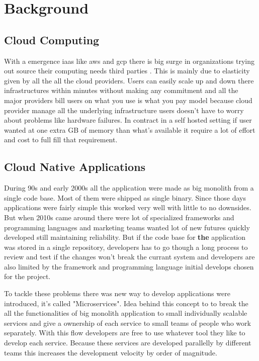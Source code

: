\section{Background}

\subsection{Cloud Computing}
With a emergence \ac{iaas} like \ac{aws} and \ac{gcp} there is big surge in organizations trying out source their computing needs third parties \citep{rimol_2021}. This is mainly due to elasticity given by all the all the cloud providers. Users can easily scale up and down there infrastructures within minutes without making any commitment and all the major providers bill users on what you use is what you pay model because cloud provider manage all the underlying infrastructure users doesn't have to worry about problems like hardware failures. In contract in a self hosted setting if user wanted at one extra GB of memory than what's available it require a lot of effort and cost to full fill that requirement.

\subsection{Cloud Native Applications}
During 90s and early 2000s all the application were made as big monolith from a single code base. Most of them were shipped as single binary. Since those days applications were fairly simple this worked very well with little to no downsides. But when 2010s came around there were lot of specialized frameworks and programming languages and marketing teams wanted lot of new futures quickly developed still maintaining reliability. But if the code base for \textbf{the} application was stored in a single repository, developers has to go though a long process to review and test if the changes won't break the currant system and developers are also limited by the framework and programming language initial develops chosen for the project.

To tackle these problems there was new way to develop applications were introduced, it's called "Microservices". Idea behind this concept to to break the all the functionalities of big monolith application to small individually scalable services and give a ownership of each service to small teams of people who work separately. With this flow developers are free to use whatever tool they like to develop each service. Because these services are developed parallelly by different teams this increases the development velocity by order of magnitude. \citep{Understa56:online}

